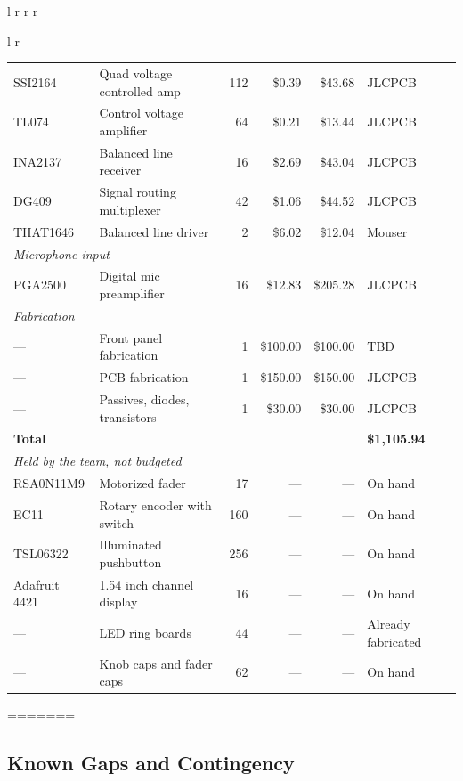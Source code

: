 \documentclass[11pt, letterpaper,titlepage]{article}
\begin{document}
\begin{table}[H]
\begin{tabular}{l r r r}
\begin{table}[H]
\begin{tabular}{l r}
\begin{table}[H]
\begin{tabular}{l l r r r l}
SSI2164        & Quad voltage controlled amp    & 112 & \$0.39  & \$43.68  & JLCPCB \\
TL074          & Control voltage amplifier      & 64  & \$0.21  & \$13.44  & JLCPCB \\
INA2137        & Balanced line receiver         & 16  & \$2.69  & \$43.04  & JLCPCB \\
DG409          & Signal routing multiplexer     & 42  & \$1.06  & \$44.52  & JLCPCB \\
THAT1646       & Balanced line driver           & 2   & \$6.02  & \$12.04  & Mouser \\
\midrule
\multicolumn{6}{l}{\textit{Microphone input}} \\
PGA2500        & Digital mic preamplifier       & 16  & \$12.83 & \$205.28 & JLCPCB \\
\midrule
\multicolumn{6}{l}{\textit{Fabrication}} \\
---            & Front panel fabrication        & 1   & \$100.00 & \$100.00 & TBD \\
---            & PCB fabrication                & 1   & \$150.00 & \$150.00 & JLCPCB \\
---            & Passives, diodes, transistors  & 1   & \$30.00  & \$30.00  & JLCPCB \\
\midrule
\multicolumn{5}{l}{\textbf{Total}} & \textbf{\$1{,}105.94} \\
\midrule
\multicolumn{6}{l}{\textit{Held by the team, not budgeted}} \\
RSA0N11M9      & Motorized fader                & 17  & --- & --- & On hand \\
EC11           & Rotary encoder with switch     & 160 & --- & --- & On hand \\
TSL06322       & Illuminated pushbutton         & 256 & --- & --- & On hand \\
Adafruit 4421  & 1.54 inch channel display      & 16  & --- & --- & On hand \\
---            & LED ring boards                & 44  & --- & --- & Already fabricated \\
---            & Knob caps and fader caps       & 62  & --- & --- & On hand \\
\bottomrule
\end{tabular}
\end{table}
=======
\subsection{Known Gaps and Contingency}
\label{ssec:budget-gaps}


\end{tabular}
\end{table}
\end{tabular}
\end{table}
\end{document}
